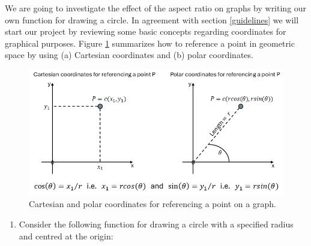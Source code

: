 \documentclass[
]{book}
\providecommand{\tightlist}{%
  \setlength{\itemsep}{0pt}\setlength{\parskip}{0pt}}
\begin{document}
We are going to investigate the effect of the aspect ratio on graphs by writing our own function for drawing a circle. In agreement with section \ref{guidelines} we will start our project by reviewing some basic concepts regarding coordinates for graphical purposes. Figure \ref{fig:coordinates} summarizes how to reference a point in geometric space by using (a) Cartesian coordinates and (b) polar coordinates.

\begin{figure}
\includegraphics[width=1\linewidth]{pics/coordinates} \caption{Cartesian and polar coordinates for referencing a point on a graph.}\label{fig:coordinates}
\end{figure}

\begin{enumerate}
\def\labelenumi{(\roman{enumi})}
\tightlist
\item
  Consider the following function for drawing a circle with a specified radius and centred at the origin:
\end{enumerate}
\end{document}
